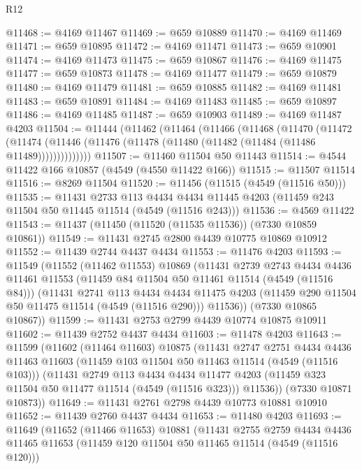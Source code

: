 \begin{lexlean}{R12}
\begin{coremodule}
@11468 := @4169 @11467
@11469 := @659 @10889
@11470 := @4169 @11469
@11471 := @659 @10895
@11472 := @4169 @11471
@11473 := @659 @10901
@11474 := @4169 @11473
@11475 := @659 @10867
@11476 := @4169 @11475
@11477 := @659 @10873
@11478 := @4169 @11477
@11479 := @659 @10879
@11480 := @4169 @11479
@11481 := @659 @10885
@11482 := @4169 @11481
@11483 := @659 @10891
@11484 := @4169 @11483
@11485 := @659 @10897
@11486 := @4169 @11485
@11487 := @659 @10903
@11489 := @4169 @11487 @4203
@11504 := @11444
    (@11462
      (@11464
        (@11466
          (@11468
            (@11470
              (@11472
                (@11474 (@11446 (@11476 (@11478 (@11480 (@11482 (@11484 (@11486 @11489))))))))))))))
@11507 := @11460 @11504 @50 @11443
@11514 := @4544 @11422 @166 @10857 (@4549 (@4550 @11422 @166))
@11515 := @11507 @11514
@11516 := @8269 @11504
@11520 := @11456 (@11515 (@4549 (@11516 @50)))
@11535 := @11431
    @2733
    @113
    @4434
    @4434
    @11445
    @4203
    (@11459 @243 @11504 @50 @11445 @11514 (@4549 (@11516 @243)))
@11536 := @4569 @11422
@11543 := @11437 (@11450 (@11520 (@11535 @11536)) (@7330 @10859 @10861))
@11549 := @11431 @2745 @2800 @4439 @10775 @10869 @10912
@11552 := @11439 @2744 @4437 @4434
@11553 := @11476 @4203
@11593 := @11549
    (@11552
      (@11462 @11553)
      @10869
      (@11431
        @2739
        @2743
        @4434
        @4436
        @11461
        @11553
        (@11459 @84 @11504 @50 @11461 @11514 (@4549 (@11516 @84)))
        (@11431
          @2741
          @113
          @4434
          @4434
          @11475
          @4203
          (@11459 @290 @11504 @50 @11475 @11514 (@4549 (@11516 @290)))
          @11536))
      (@7330 @10865 @10867))
@11599 := @11431 @2753 @2799 @4439 @10774 @10875 @10911
@11602 := @11439 @2752 @4437 @4434
@11603 := @11478 @4203
@11643 := @11599
    (@11602
      (@11464 @11603)
      @10875
      (@11431
        @2747
        @2751
        @4434
        @4436
        @11463
        @11603
        (@11459 @103 @11504 @50 @11463 @11514 (@4549 (@11516 @103)))
        (@11431
          @2749
          @113
          @4434
          @4434
          @11477
          @4203
          (@11459 @323 @11504 @50 @11477 @11514 (@4549 (@11516 @323)))
          @11536))
      (@7330 @10871 @10873))
@11649 := @11431 @2761 @2798 @4439 @10773 @10881 @10910
@11652 := @11439 @2760 @4437 @4434
@11653 := @11480 @4203
@11693 := @11649
    (@11652
      (@11466 @11653)
      @10881
      (@11431
        @2755
        @2759
        @4434
        @4436
        @11465
        @11653
        (@11459 @120 @11504 @50 @11465 @11514 (@4549 (@11516 @120)))

\end{coremodule}
\end{lexlean}
